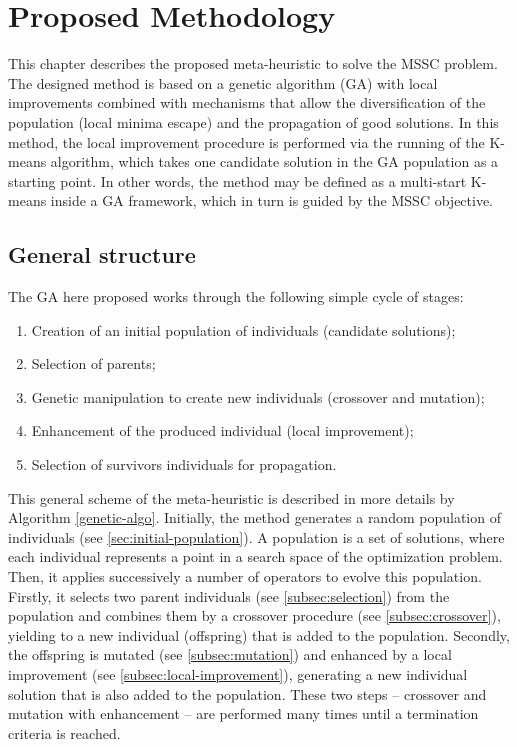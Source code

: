 \chapter{Proposed Methodology}
\label{chap:methodology}
This chapter describes the proposed meta-heuristic to solve the MSSC problem. The designed method is based on a genetic algorithm (GA) with local improvements combined with mechanisms that allow the diversification of the population (local minima escape) and the propagation of good solutions. In this method, the local improvement procedure is performed via the running of the K-means algorithm, which takes one candidate solution in the GA population as a starting point. In other words, the method may be defined as a multi-start K-means inside a GA framework, which in turn is guided by the MSSC objective. 

\section{General structure}
\label{sec:general-structure}
The GA here proposed works through the following simple cycle of stages:

\begin{enumerate}
	\item Creation of an initial population of individuals (candidate solutions);

	\item Selection of parents;

	\item Genetic manipulation to create new individuals (crossover and mutation);
	
	\item Enhancement of the produced individual (local improvement);
	
	\item Selection of survivors individuals for propagation.
	
\end{enumerate}

This general scheme of the meta-heuristic is described in more details by Algorithm \ref{genetic-algo}. Initially, the method generates a random population of individuals (see \ref{sec:initial-population}). A population is a set of solutions, where each individual represents a point in a search space of the optimization problem. Then, it applies successively a number of operators to evolve this population. Firstly, it selects two parent individuals (see \ref{subsec:selection}) from the population and combines them by a crossover procedure (see \ref{subsec:crossover}), yielding to a new individual (offspring) that is added to the population. Secondly, the offspring is mutated (see \ref{subsec:mutation}) and enhanced by a local improvement (see \ref{subsec:local-improvement}), generating a new individual solution that is also added to the population. These two steps -- crossover and mutation with enhancement -- are performed many times until a termination criteria is reached.

